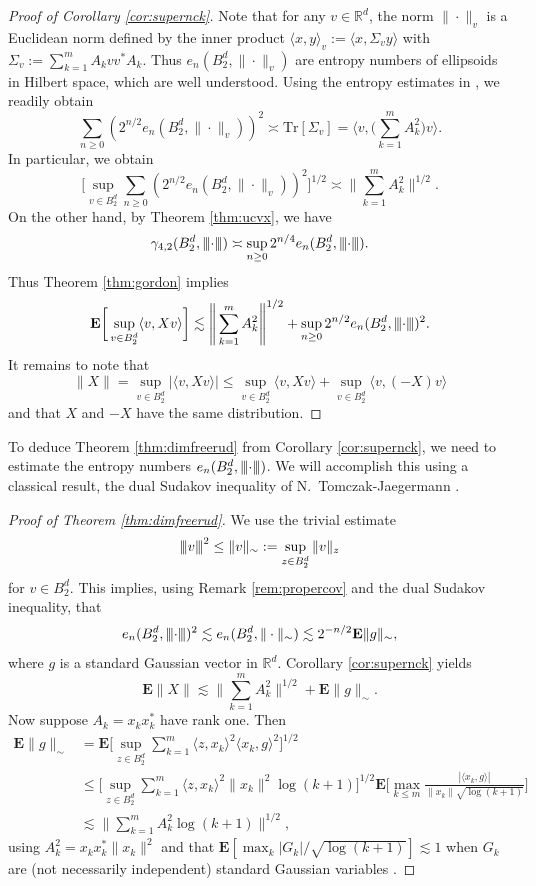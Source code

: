 \documentclass[10pt,reqno]{amsart}
\theoremstyle{definition}
\numberwithin{equation}{section}
\numberwithin{figure}{section}
\numberwithin{table}{section}
\newcommand{\mynegspace}{\hspace{-0.12em}}
\newcommand{\vvv}{\rvert\mynegspace\rvert\mynegspace\rvert}
\newcommand{\nnn}[1]{{\vvv #1 \vvv}}
\begin{document}
\begin{proof}[Proof of Corollary \ref{cor:supernck}]
Note that for any $v\in\mathbb{R}^d$, the norm $\|\cdot\|_v$ is 
a Euclidean norm defined by the inner product $\langle x,y\rangle_v := 
\langle x,\Sigma_vy\rangle$ with $\Sigma_v := \sum_{k=1}^mA_kvv^*A_k$.
Thus $e_n(B_2^d,\|\cdot\|_v)$ are entropy numbers of ellipsoids in Hilbert 
space, which are well understood. Using the entropy estimates in
\cite[section 2.5]{Tal14}, we readily obtain
$$
	\sum_{n\ge 0} (2^{n/2}e_n(B_2^d,\|\cdot\|_v))^2 \asymp
	\mathrm{Tr}[\Sigma_v] =
	\Bigg\langle v,\Bigg(\sum_{k=1}^m A_k^2\Bigg)v\Bigg\rangle.
$$
In particular, we obtain
$$
	\Bigg[\sup_{v\in B_2^d}
	\sum_{n\ge 0} (2^{n/2}e_n(B_2^d,\|\cdot\|_v))^2\Bigg]^{1/2}
	\asymp \Bigg\|\sum_{k=1}^m A_k^2\Bigg\|^{1/2}.
$$
On the other hand, by Theorem \ref{thm:ucvx}, we have
$$
	\gamma_{4,2}(B_2^d,\nnn{\cdot}) \asymp
	\sup_{n\ge 0}2^{n/4}e_n(B_2^d,\nnn{\cdot}).
$$
Thus Theorem \ref{thm:gordon} implies
$$
	\mathbf{E}\bigg[\sup_{v\in B_2^d}\langle v,Xv\rangle\bigg]
	\lesssim
	\Bigg\|\sum_{k=1}^m A_k^2\Bigg\|^{1/2} +
	\sup_{n\ge 0}2^{n/2}e_n(B_2^d,\nnn{\cdot})^2.
$$
It remains to note that
$$
	\|X\| = \sup_{v\in B_2^d}|\langle v,Xv\rangle|
	\le \sup_{v\in B_2^d}\langle v,Xv\rangle +
	\sup_{v\in B_2^d}\langle v,(-X)v\rangle
$$
and that $X$ and $-X$ have the same distribution.
\end{proof}

To deduce Theorem \ref{thm:dimfreerud} from Corollary 
\ref{cor:supernck}, we need to estimate the entropy numbers
$e_n(B_2^d,\nnn{\cdot})$. We will accomplish this using a classical 
result, the dual Sudakov inequality of N.\ Tomczak-Jaegermann
\cite[Lemma 8.3.6]{Tal14}.

\begin{proof}[Proof of Theorem \ref{thm:dimfreerud}]
We use the trivial estimate
$$
	\nnn{v}^2 \le \|v\|_\sim :=
	\sup_{z\in B_2^d}\|v\|_z
$$
for $v\in B_2^d$. This implies, using Remark \ref{rem:propercov}
and the dual Sudakov inequality, that
$$
	e_n(B_2^d,\nnn{\cdot})^2 \lesssim
	e_n(B_2^d,\|\cdot\|_\sim) \lesssim
	2^{-n/2}\mathbf{E}\|g\|_\sim,
$$
where $g$ is a standard Gaussian vector in $\mathbb{R}^d$.
Corollary \ref{cor:supernck} yields
$$
	\mathbf{E}\|X\| \lesssim
	\Bigg\|\sum_{k=1}^m A_k^2\Bigg\|^{1/2} +
	\mathbf{E}\|g\|_\sim.
$$
Now suppose $A_k=x_kx_k^*$ have rank one. Then
\begin{align*}
	\mathbf{E}\|g\|_\sim &=
	\mathbf{E}\Bigg[
	\sup_{z\in B_2^d}\sum_{k=1}^m
	\langle z,x_k\rangle^2 \langle x_k,g\rangle^2
	\Bigg]^{1/2} \\
	&\le
	\Bigg[\sup_{z\in B_2^d}
	\sum_{k=1}^m
	\langle z,x_k\rangle^2\|x_k\|^2\log(k+1)\Bigg]^{1/2}
	\mathbf{E}\bigg[
	\max_{k\le m}
	\frac{|\langle x_k,g\rangle|}{\|x_k\|\sqrt{\log(k+1)}}
	\bigg]
	\\
	&\lesssim
	\Bigg\|
	\sum_{k=1}^m A_k^2\log(k+1)
	\Bigg\|^{1/2},	
\end{align*}
using $A_k^2 = x_kx_k^*\|x_k\|^2$ and that
$\mathbf{E}[\max_{k}|G_k|/\sqrt{\log(k+1)}]\lesssim 1$ when
$G_k$ are (not necessarily independent) standard Gaussian 
variables \cite[Proposition 2.4.16]{Tal14}.
\end{proof}
\end{document}

